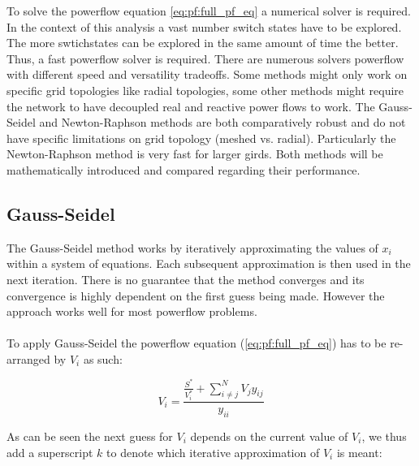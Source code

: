 
To solve the powerflow equation \ref{eq:pf:full_pf_eq} a numerical solver
is required\autocite{power_system_analysis}. In the context of this analysis
a vast number switch states have to be explored. The more swtichstates
can be explored in the same amount of time the better. Thus, a fast powerflow
solver is required. There are numerous solvers powerflow with different speed
and versatility tradeoffs\autocite{pf_methods_comparison}. Some methods might
only work on specific grid topologies like radial topologies, some other methods
might require the network to have decoupled real and reactive power flows to work.
The Gauss-Seidel and Newton-Raphson methods are both comparatively robust and do not
have specific limitations on grid topology (meshed vs. radial)\autocite{pf_methods_comparison}.
Particularly the Newton-Raphson method is very fast for larger girds. Both methods
will be mathematically introduced and compared regarding their performance.

\subsection{Gauss-Seidel}

The Gauss-Seidel method works by iteratively approximating the values of $x_i$ within a system of 
equations. Each subsequent approximation is then used in the next iteration. There is no guarantee that
the method converges and its convergence is highly dependent on the first guess being made. However the approach
works well for most powerflow problems\autocite{power_system_analysis}.\\
\\

To apply Gauss-Seidel the powerflow equation (\ref{eq:pf:full_pf_eq}) has to be re-arranged
by $V_i$ as such:

\begin{equation}
    V_i = \frac{\frac{S^*}{V_i^*} + \sum_{i \ne j}^N V_j y_{ij}}{y_{ii}}
\end{equation}

As can be seen the next guess for $V_i$ depends on the current value of $V_i$, we thus add a superscript $k$
to denote which iterative approximation of $V_i$ is meant:

